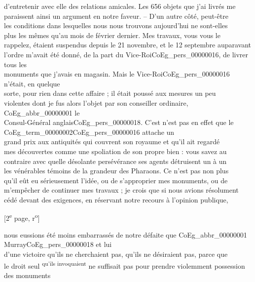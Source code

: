 \documentclass{book}
\begin{document}
d’entretenir avec elle des relations amicales. Les 656 objets que j’ai livrés me\\
paraissent ainsi un argument en notre faveur. – D’un autre côté, peut-être\\
les conditions dans lesquelles nous nous trouvons aujourd’hui ne sont-elles\\
plus les mêmes qu’au mois de février dernier. Mes travaux, vous vous le\\
rappelez, étaient suspendus depuis le 21 novembre, et le 12 septembre auparavant\\
l’ordre m’avait été donné, de la part du Vice-Roi\gls{CoEg_pers_00000016}, de livrer tous les\\
monuments que j’avais en magasin. Mais le Vice-Roi\gls{CoEg_pers_00000016} n’était, en quelque\\
sorte, pour rien dans cette affaire ; il était poussé aux mesures un peu\\
violentes dont je fus alors l’objet par son conseiller ordinaire, \gls{CoEg_abbr_00000001} le\\
Consul-Général anglais\gls{CoEg_pers_00000018}. C’est n’est pas en effet que le \gls{CoEg_term_00000002}\gls{CoEg_pers_00000016} attache un\\
grand prix aux antiquités qui couvrent son royaume et qu’il ait regardé\\
mes découvertes comme une spoliation de son propre bien : vous savez au\\
contraire avec quelle désolante persévérance ses agents détruisent un à un\\
les vénérables témoins de la grandeur des Pharaons. Ce n’est pas non plus\\
qu’il eût eu sérieusement l’idée, ou de s’approprier mes monuments, ou de\\
m’empêcher de continuer mes travaux ; je crois que si nous avions résolument\\
cédé devant des exigences, en réservant notre recours à l’opinion publique,\\
{\footnotesize \begin{center} {[2\textsuperscript{e} page, r\textsuperscript{o}]}\end{center}}
\noindent nous eussions été moins embarrassés de notre défaite que \gls{CoEg_abbr_00000001} Murray\gls{CoEg_pers_00000018} et lui\\
d’une victoire qu’ils ne cherchaient pas, qu’ils ne désiraient pas, parce que\\
le droit seul \textsuperscript{qu’ils invoquaient} ne suffisait pas pour prendre violemment possession des monuments\\
\end{document}
